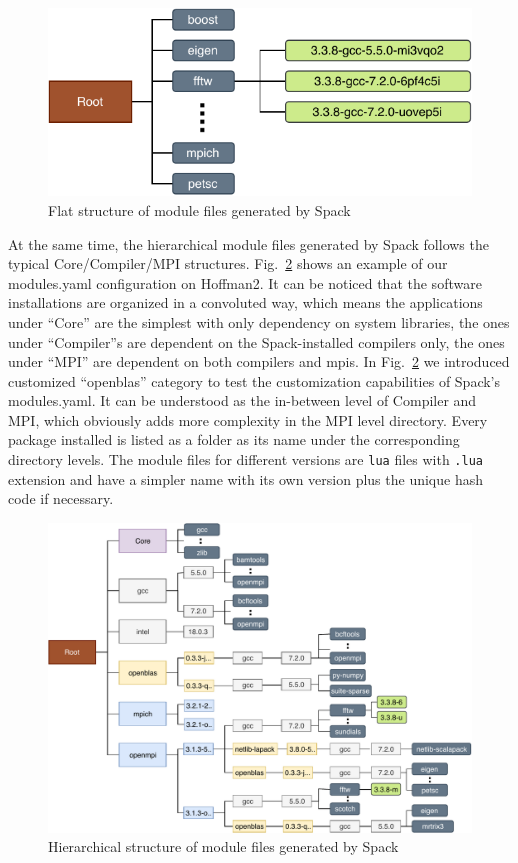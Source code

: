 \documentclass[conference]{IEEEtran}
\begin{document}
\begin{figure}[htbp]
  \centerline{\includegraphics[width=\linewidth]{figures/spack_flat}}
  \caption{Flat structure of module files generated by Spack}
  \label{fig:spack_flat}
\end{figure}

At the same time, the hierarchical module files generated by Spack follows the typical Core/Compiler/MPI structures. Fig.~\ref{fig:spack_hier} shows an example of our modules.yaml configuration on Hoffman2. It can be noticed that the software installations are organized in a convoluted way, which means the applications under ``Core'' are the simplest with only dependency on system libraries, the ones under ``Compiler''s are dependent on the Spack-installed compilers only, the ones under ``MPI'' are dependent on both compilers and mpis. In Fig.~\ref{fig:spack_hier} we introduced customized ``openblas'' category to test the customization capabilities of Spack's modules.yaml. It can be understood as the in-between level of Compiler and MPI, which obviously adds more complexity in the MPI level directory. Every package installed is listed as a folder as its name under the corresponding directory levels. The module files for different versions are \texttt{lua} files with \texttt{.lua} extension and have a simpler name with its own version plus the unique hash code if necessary.

\begin{figure}[htbp]
  \centerline{\includegraphics[width=\linewidth]{figures/spack_hier}}
  \caption{Hierarchical structure of module files generated by Spack}
  \label{fig:spack_hier}
\end{figure}
\end{document}
